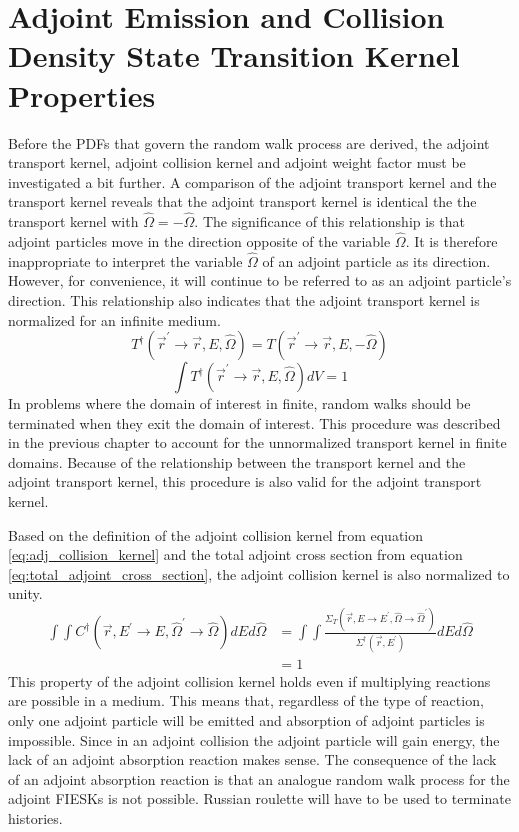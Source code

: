 \section{Adjoint Emission and Collision Density State Transition Kernel Properties}
Before the PDFs that govern the random walk process are derived, the adjoint
transport kernel, adjoint collision kernel and adjoint weight factor must be 
investigated a bit further. A comparison of the adjoint transport kernel and 
the transport kernel reveals that the adjoint transport kernel is identical 
the the transport kernel with $\hat{\Omega} = -\hat{\Omega}$. The significance 
of this relationship is that adjoint particles move in the direction opposite 
of the variable $\hat{\Omega}$. It is therefore inappropriate to interpret the 
variable $\hat{\Omega}$ of an adjoint particle as its direction. However, for 
convenience, it will continue to be referred to as an adjoint particle's 
direction. This relationship also indicates that the adjoint transport kernel
is normalized for an infinite medium.
\begin{equation}
  T^{\dagger}(\vec{r}^{'} \to \vec{r},E,\hat{\Omega}) = 
  T(\vec{r}^{'} \to \vec{r},E,-\hat{\Omega}) 
\end{equation}
\begin{equation}
  \int T^{\dagger}(\vec{r}^{'} \to \vec{r},E,\hat{\Omega}) dV = 1
\end{equation}
In problems where the domain of interest in finite, random walks should be 
terminated when they exit the domain of interest. This procedure was described
in the previous chapter to account for the unnormalized transport kernel in
finite domains. Because of the relationship between the transport kernel and 
the adjoint transport kernel, this procedure is also valid for the adjoint
transport kernel. 

Based on the definition of the adjoint collision kernel from equation
\ref{eq:adj_collision_kernel} and the total adjoint cross section from 
equation \ref{eq:total_adjoint_cross_section}, the adjoint collision kernel is 
also normalized to unity. 
\begin{align}
  \int\int C^{\dagger}(\vec{r},E^{'} \to E,\hat{\Omega}^{'} \to \hat{\Omega})
  dE d\hat{\Omega} & = \int\int 
  \frac{\Sigma_T(\vec{r},E \to E^{'},\hat{\Omega} \to \hat{\Omega}^{'})} 
       {\Sigma^{\dagger}(\vec{r},E^{'})} dEd\hat{\Omega} \nonumber \\
  & = 1 \nonumber 
\end{align}
This property of the adjoint collision kernel holds even if multiplying
reactions are possible in a medium. This means that, regardless of the
type of reaction, only one adjoint particle will be emitted and absorption of
adjoint particles is impossible. Since in an adjoint collision the adjoint
particle will gain energy, the lack of an adjoint absorption reaction makes
sense. The consequence of the lack of an adjoint absorption reaction is that
an analogue random walk process for the adjoint FIESKs is not possible. Russian 
roulette will have to be used to terminate histories.        


